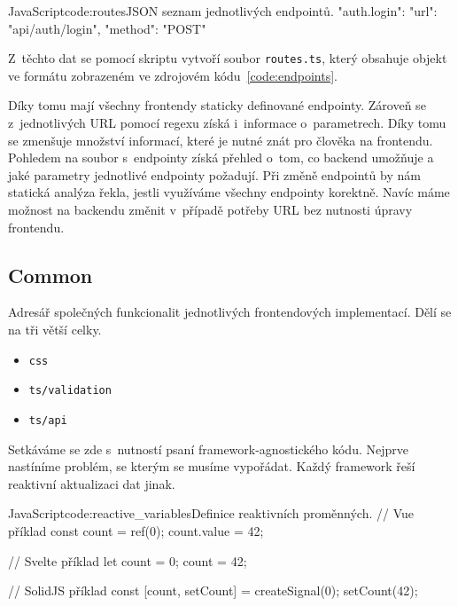 \documentclass[
  master,
  program=ainf,
  printversion,
  tables=false,
  sourcecodes,
  glossaries,
  index
]{kidiplom}
\begin{document}
\begin{kicode}{JavaScript}{code:routes}{JSON seznam jednotlivých endpointů.}
{
  "auth.login":{
    "url": "api/auth/login",
    "method": "POST"
  }
}
\end{kicode}


Z~těchto dat se pomocí skriptu vytvoří soubor {\tt routes.ts}, který obsahuje objekt ve formátu zobrazeném 
ve zdrojovém kódu~\ref{code:endpoints}.


Díky tomu mají všechny frontendy staticky definované endpointy. Zároveň se
z~jednotlivých URL pomocí regexu získá i~informace o~parametrech. Díky tomu 
se zmenšuje množství informací, které je nutné znát pro člověka na frontendu.
Pohledem na soubor s~endpointy získá přehled o~tom, co backend umožňuje a jaké
parametry jednotlivé endpointy požadují. Při změně endpointů by nám statická analýza
řekla, jestli využíváme všechny endpointy korektně. Navíc máme možnost na backendu
změnit v~případě potřeby URL bez nutnosti úpravy frontendu.

\subsection{Common}
Adresář společných funkcionalit jednotlivých frontendových implementací. Dělí se
na tři větší celky.

\begin{itemize}
  \item {\tt css}
  \item {\tt ts/validation}
  \item {\tt ts/api}
\end{itemize}

Setkáváme se zde s~nutností psaní framework-agnostického kódu. Nejprve
nastíníme problém, se kterým se musíme vypořádat. Každý framework řeší
reaktivní aktualizaci dat jinak.

\begin{kicode}{JavaScript}{code:reactive_variables}{Definice reaktivních proměnných.}
  // Vue příklad
  const count = ref(0);
  count.value = 42;

  // Svelte příklad
  let count = 0;
  count = 42;

  // SolidJS příklad
  const [count, setCount] = createSignal(0);
  setCount(42);
\end{kicode}
\end{document}
